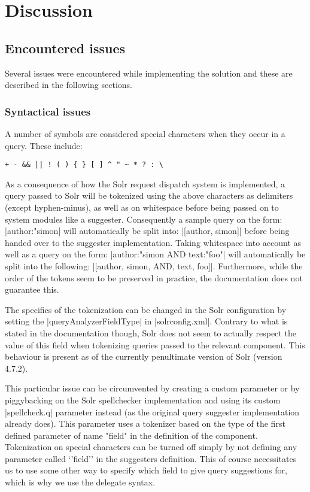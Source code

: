 \section{Discussion}\label{discussion}

\subsection{Encountered issues}

Several issues were encountered while implementing the solution and these are described in the following sections. 

\subsubsection{Syntactical issues}

A number of symbols are considered special characters when they occur in a query. These include\cite{QUERY}:
\begin{verbatim}
+ - && || ! ( ) { } [ ] ^ " ~ * ? : \
\end{verbatim}

As a consequence of how the Solr request dispatch system is implemented, a query passed to Solr will be tokenized using the above characters as delimiters (except hyphen-minus), as well as on whitespace before being passed on to system modules like a suggester.
Consequently a sample query on the form: |author:"simon| will automatically be split into: |[author, simon]|
before being handed over to the suggester implementation.
Taking whitespace into account as well as a query on the form: |author:"simon AND text:"foo"| will automatically be split into the following: |[author, simon, AND, text, foo]|.
Furthermore, while the order of the tokens seem to be preserved in practice, the documentation does not guarantee this.

The specifics of the tokenization can be changed in the Solr configuration by setting the |queryAnalyzerFieldType| in |solrconfig.xml|. Contrary to what is stated in the documentation though, Solr does not seem to actually respect the value of this field when tokenizing queries passed to the relevant component. This behaviour is present as of the currently penultimate version of Solr (version 4.7.2).

This particular issue can be circumvented by creating a custom parameter or by piggybacking on the Solr spellchecker implementation and using its custom |spellcheck.q| parameter instead (as the original query suggester implementation already does).
This parameter uses a tokenizer based on the type of the first defined parameter of name "field" in the definition of the component.\cite{FIELDTYPE}
Tokenization on special characters can be turned off simply by not defining any parameter called ‘’field’’ in the suggesters definition. This of course necessitates us to use some other way to specify which field to give query suggestions for, which is why we use the delegate syntax.

